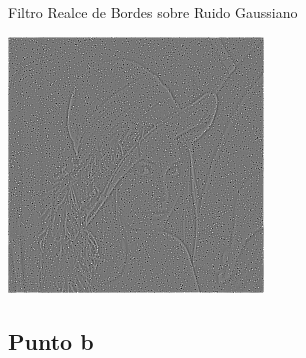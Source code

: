 \documentclass{beamer}
\begin{document}
\begin{frame}[fragile]{Filtro Realce de Bordes sobre Ruido Gaussiano}
\begin{minipage}{0.25\linewidth}
	\end{minipage}\hfill
	\begin{minipage}{0.25\linewidth}
		\centering
		\includegraphics[width=\linewidth]{../results/lena_gauss_sigma50_bordes}
	\end{minipage}
\end{frame}

\subsection{Punto b}
\end{document}
